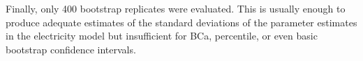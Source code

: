 \documentclass{article}
\begin{document}
Finally, only 400 bootstrap replicates were evaluated.  This is usually enough to produce adequate estimates of the standard deviations of the parameter estimates in the electricity model but insufficient for BCa, percentile, or even basic bootstrap confidence intervals. 

\end{document}

